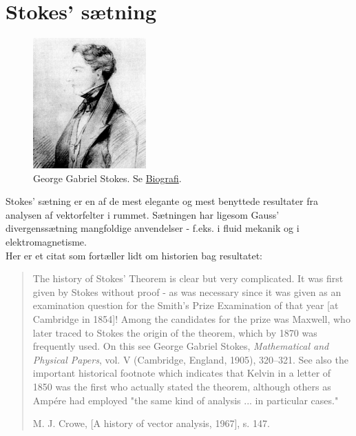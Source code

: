 




\section{Stokes' sætning}  \label{secIntro}


\begin{figure}[h]
\centerline{\includegraphics[height=50mm]{FIGS/PERSStokes_4}}
\begin{center}
\caption{\small{George Gabriel Stokes. Se \href{http://www-history.mcs.st-and.ac.uk/Mathematicians/Stokes.html}{Biografi}.}} \label{figStokes}
\end{center}
\end{figure}



{Stokes' sætning} er en af de mest elegante og mest
benyttede resultater fra analysen af vektorfelter
i rummet. Sætningen har ligesom Gauss'
divergenssætning mangfoldige anvendelser - f.eks.
i fluid mekanik og i elektromagnetisme. \\

Her er et
citat som fortæller lidt om
historien bag resultatet:\\

\begin{quote}
The history of Stokes' Theorem is clear but very
complicated. It was first given by Stokes without
proof - as was necessary since it was given as
an examination question for the Smith's Prize
Examination of that year [at Cambridge in 1854]!
Among the candidates for the prize was Maxwell,
who later traced to Stokes the origin of the
theorem, which by 1870 was frequently used. On
this see George Gabriel Stokes, {\em{Mathematical
and Physical Papers}}, vol. V (Cambridge,
England, 1905), 320--321. See also the important
historical footnote which indicates that Kelvin
in a letter of 1850 was the first who actually
stated the theorem, although others as Amp\'{e}re
had employed "the same kind of analysis ... in
particular cases."

\begin{flushright}
M. J. Crowe, [A history of vector analysis, 1967],  s. 147.
\end{flushright}
\end{quote}


